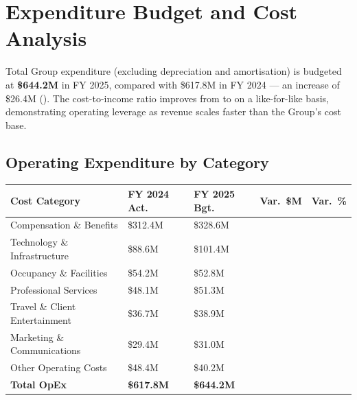 
\section{Expenditure Budget and Cost Analysis}

Total Group expenditure (excluding depreciation and amortisation) is budgeted at
\textbf{\$644.2M} in FY 2025, compared with \$617.8M in FY 2024 — an increase of
\$26.4M (). The cost-to-income ratio improves from  to
 on a like-for-like basis, demonstrating operating leverage as revenue
scales faster than the Group's cost base.

\subsection{Operating Expenditure by Category}

\vspace{4pt}
\begin{center}
\renewcommand{\arraystretch}{1.38}
\begin{tabular}{L{4.8cm} R{2.0cm} R{2.0cm} R{1.8cm} R{2.1cm}}
  \toprule
  \color{white}\textbf{Cost Category} &
  \color{white}\textbf{FY 2024 Act.} &
  \color{white}\textbf{FY 2025 Bgt.} &
  \color{white}\textbf{Var.\ \$M} &
  \color{white}\textbf{Var.\ \%} \\
  \midrule
  Compensation \& Benefits       & \$312.4M & \$328.6M &  &   \\
  Technology \& Infrastructure   & \$88.6M  & \$101.4M &  &  \\
  Occupancy \& Facilities        & \$54.2M  & \$52.8M  &   &   \\
  Professional Services          & \$48.1M  & \$51.3M  &   &   \\
  Travel \& Client Entertainment & \$36.7M  & \$38.9M  &   &   \\
  Marketing \& Communications    & \$29.4M  & \$31.0M  &   &   \\
  Other Operating Costs          & \$48.4M  & \$40.2M  &   &  \\
  \midrule
  \textbf{Total OpEx}            & \textbf{\$617.8M} & \textbf{\$644.2M} &  &  \\
  \bottomrule
\end{tabular}
\end{center}

